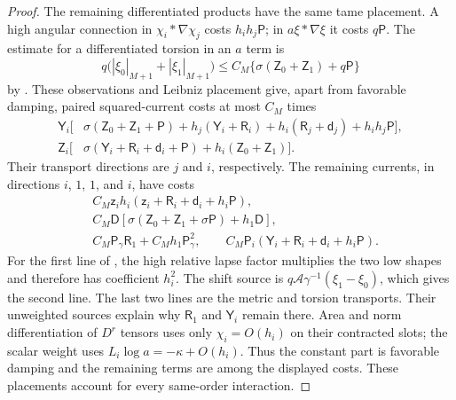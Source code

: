 \begin{proof}
The remaining differentiated products have the same tame placement.
A high angular connection in $\chi_i*\nabla\chi_j$ costs
$h_ih_j\mathsf P$; in $a\xi*\nabla\xi$ it costs $q\mathsf P$.
The estimate for a differentiated torsion in an $a$ term is
\[
 q\bigl(|\xi_0|_{M+1}+|\xi_1|_{M+1}\bigr)
 \le C_M\{\sigma(\mathsf Z_0+\mathsf Z_1)+q\mathsf P\}
\]
by .  These observations and Leibniz placement give,
apart from favorable damping, paired squared-current costs at most
$C_M$ times
\begin{equation}\label{dn:high-pair-costs}
\begin{aligned}
 \mathsf Y_i\big[&\sigma(\mathsf Z_0+\mathsf Z_1+\mathsf P)
       +h_j(\mathsf Y_i+\mathsf R_i)
       +h_i(\mathsf R_j+\mathsf d_j)+h_ih_j\mathsf P\big],\\
 \mathsf Z_i\big[&\sigma(\mathsf Y_i+\mathsf R_i+
                        \mathsf d_i+\mathsf P)
                         +h_i(\mathsf Z_0+\mathsf Z_1)\big].
\end{aligned}
\end{equation}
Their transport directions are $j$ and $i$, respectively.
The remaining currents, in directions $i$, $1$, $1$, and $i$, have
costs
\begin{equation}\label{dn:high-other-costs}
\begin{aligned}
 &C_M\mathsf z_i h_i(\mathsf z_i+\mathsf R_i+
                                      \mathsf d_i+h_i\mathsf P),\\
 &C_M\mathsf D[\sigma(\mathsf Z_0+\mathsf Z_1+
                                      \sigma\mathsf P)+h_1\mathsf D],\\
 &C_M\mathsf P_\gamma\mathsf R_1+C_Mh_1\mathsf P_\gamma^2,
 \qquad C_M\mathsf P_i(\mathsf Y_i+\mathsf R_i+
                                      \mathsf d_i+h_i\mathsf P).
\end{aligned}
\end{equation}
For the first line of , the high relative
lapse factor multiplies the two low shapes and therefore has
coefficient $h_i^2$.  The shift source is
$q\mathcal A\gamma^{-1}(\xi_1-\xi_0)$, which gives the second line.
The last two lines are the metric and torsion transports.  Their
unweighted sources explain why $\mathsf R_1$ and $\mathsf Y_i$
remain there.  Area and norm differentiation of $D^r$ tensors uses
only $\chi_i=O(h_i)$ on their contracted slots; the scalar weight
uses $L_i\log a=-\kappa+O(h_i)$.  Thus the constant part is favorable
damping and the remaining terms are among the displayed costs.
These placements account for every same-order interaction.


\end{proof}
